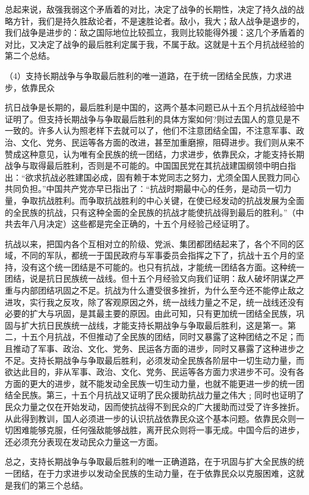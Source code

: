 \documentclass[UTF8, 12pt, a4paper]{ctexrep}
\begin{document}
总起来说，敌强我弱这个矛盾着的对比，决定了战争的长期性，决定了持久战的战略方针，我们是持久胜敌论者，不是速胜论者。敌小，我大；敌人战争是退步的，我们战争是进步的：敌之国际地位比较孤立，我则比较能得外援：这几个矛盾着的对比，又决定了战争的最后胜利定属于我，不属于敌。这就是十五个月抗战经验的第二个总结。

（4）支持长期战争与争取最后胜利的唯一道路，在于统一团结全民族，力求进步，依靠民众

抗日战争是长期的，最后胜利是中国的，这两个基本问题已从十五个月抗战经验中证明了。但支持长期战争与争取最后胜利的具体方案如何?则过去国人的意见是不一致的。许多人认为照老样下去就可以了，他们不注意团结全国，不注意军事、政治、文化、党务、民运等各方面的改进，甚至加重磨擦，阻碍进步。我们则从来不赞成这种意见，认为唯有全民族的统一团结，力求进步，依靠民众，才能支持长期战争与取得最后胜利，否则是不可能的。中国国民党在其抗战建国纲领中明白指出：“欲求抗战必胜建国必成，固有赖于本党同志之努力，尤须全国人民戮力同心共同负担。”中国共产党亦早已指出了：“抗战时期最中心的任务，是动员一切力量，争取抗战胜利。而争取抗战胜利的中心关键，在使已经发动的抗战发展为全面的全民族的抗战，只有这种全面的全民族的抗战才能使抗战得到最后的胜利。”（中共去年八月决定）这些都是完全正确的，十五个月经验己经证明了。

抗战以来，把国内各个互相对立的阶级、党派、集团都团结起来了，各个不同的区域，不同的军队，都统一于国民政府与军事委员会指挥之下了，抗战十五个月的坚持，没有这个统一团结是不可能的。也只有抗战，才能统一团结各方面。这种统一团结，说是抗日民族统一战线。但十五个月经验又向我们证明：敌人破坏阴谋之严重与内部团结巩固之不足。抗战为什么遭受很多挫折，为什么至今还不能停止敌之进攻，实行我之反攻，除了客观原因之外，统一战线力量之不足，统一战线还没有必要的扩大与巩固，是其最主要的原因。由此可知，只有更加统一团结全民族，巩固与扩大抗日民族统一战线，才能支持长期战争与争取最后胜利，这是第一。第二，十五个月抗战，不但推动了全民族的团结，同时又暴露了这种团结之不足；而且推动了军事、政治、文化、党务、民运各方面的进步，同时又暴露了这种进步之不足。支持长期战争与争取最后胜利，必须发动全民族各阶层中一切生动力量，而欲达此目的，非从军事、政治、文化、党务、民运等各方面力求进步不可。没有各方面的更大的进步，就不能发动全民族一切生动力量，也就不能更进一步的统一团结全民族。第三，十五个月抗战又证明了民众援助抗战力量之伟大﹔同时也证明了民众力量之仅在开始发动，因而使抗战得不到民众的广大援助而过受了许多挫折。从此得到教训，国人必须进一步的认识抗战依靠民众这个基本问题。依靠民众则一切困难能够克服，任何强敌能够战胜，离开民众则将一事无成。中国今后的进步，还必须充分表现在发动民众力量这一方面。

总之，支持长期战争与争取最后胜利的唯一正确道路，在于巩固与扩大全民族的统一团结，在于力求进步以发动全民族的生动力量，在于依靠民众以克服困难，这就是我们的第三个总结。
\end{document}
